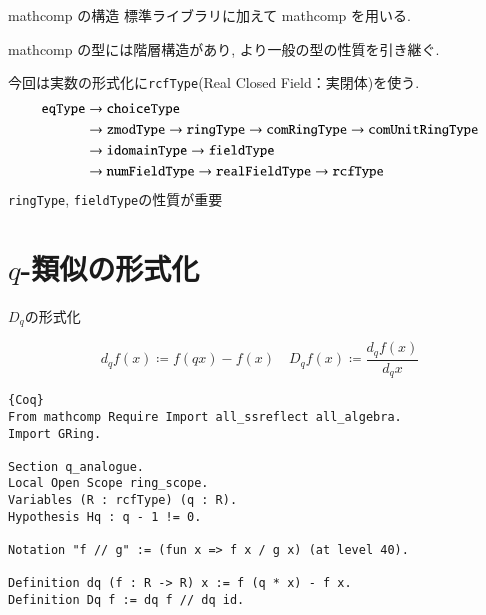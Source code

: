 \documentclass[dvipdfmx,cjk]{beamer}
\theoremstyle{mystyle}
\newcommand{\0}{\textbf{0}}
\begin{document}

\begin{frame}{mathcomp の構造}
	標準ライブラリ\cite{coq sl}に加えて mathcomp \cite{coq mc}を用いる. 
	
	mathcomp の型には階層構造があり, より一般の型の性質を引き継ぐ. 
	
	今回は実数の形式化に{\tt rcfType}(Real Closed Field：実閉体)を使う. 
	\begin{align*}
		{\tt eqType} &\to {\tt choiceType} \\
		                  &\to {\tt zmodType} \to {\tt ringType} \to 
		                          {\tt comRingType} \to {\tt comUnitRingType}\\
							  &\to {\tt idomainType} \to {\tt fieldType}\\
		                  &\to {\tt numFieldType} \to {\tt realFieldType} \to {\tt rcfType}
	\end{align*}
	{\tt ringType}, {\tt fieldType}の性質が重要
\end{frame}
\section{$q$-類似の形式化}

\begin{frame}
  \tableofcontents[currentsection] 
\end{frame}

\begin{frame}[fragile]{$D_q$の形式化}
	\begin{screen}
		\[
			d_q f (x) \coloneqq f(qx) - f(x) \quad D_q f (x) \coloneqq \frac{d_q f(x)}{d_q x}
		\]
	\end{screen}
	\begin{lstlisting}{Coq}
From mathcomp Require Import all_ssreflect all_algebra.
Import GRing.

Section q_analogue.
Local Open Scope ring_scope.
Variables (R : rcfType) (q : R).
Hypothesis Hq : q - 1 != 0.

Notation "f // g" := (fun x => f x / g x) (at level 40).

Definition dq (f : R -> R) x := f (q * x) - f x.
Definition Dq f := dq f // dq id. \end{lstlisting}
\end{frame}
\end{document}
